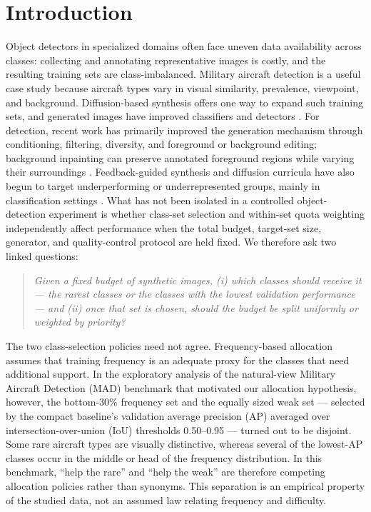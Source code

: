 \documentclass[preprint,12pt,authoryear]{elsarticle}
\begin{document}
\section{Introduction}\label{sec:intro}

Object detectors in specialized domains often face uneven data
availability across classes: collecting and annotating representative
images is costly, and the resulting training sets are class-imbalanced.
Military aircraft detection is a useful case study because aircraft
types vary in visual similarity, prevalence, viewpoint, and background.
Diffusion-based synthesis offers one way to expand such training sets,
and generated images have improved classifiers
\citep{azizi2023synthetic, he2023synthetic} and detectors
\citep{suri2024gen2det, feng2024instagen}. For detection, recent work has
primarily improved the generation mechanism through conditioning,
filtering, diversity, and foreground or background editing; background
inpainting can preserve annotated foreground regions while varying their
surroundings \citep{li2024background}. Feedback-guided synthesis and
diffusion curricula have also begun to target underperforming or
underrepresented groups, mainly in classification settings
\citep{hemmat2024feedback, liang2025discl}. What has not been isolated in a controlled object-detection experiment
is whether class-set selection and within-set quota weighting
independently affect performance when the total budget, target-set
size, generator, and quality-control protocol are held fixed. We therefore ask two linked
questions:

\begin{quote}\itshape
Given a fixed budget of synthetic images, (i) which classes should
receive it --- the rarest classes or the classes with the lowest
validation performance --- and (ii) once that set is chosen, should the
budget be split uniformly or weighted by priority?
\end{quote}

The two class-selection policies need not agree. Frequency-based
allocation assumes that training frequency is an adequate proxy for the
classes that need additional support. In the exploratory analysis of
the natural-view Military Aircraft Detection (MAD) benchmark that
motivated our allocation hypothesis, however, the bottom-30\%
frequency set and the equally sized weak set --- selected by the
compact baseline's validation average precision (AP) averaged over
intersection-over-union (IoU) thresholds 0.50--0.95 --- turned out to
be disjoint. Some rare aircraft types are visually distinctive, whereas several of the
lowest-AP classes occur in the middle or head of the frequency
distribution. In this benchmark, ``help the rare'' and ``help the weak''
are therefore competing allocation policies rather than synonyms. This
separation is an empirical property of the studied data, not an assumed
law relating frequency and difficulty.
\end{document}
